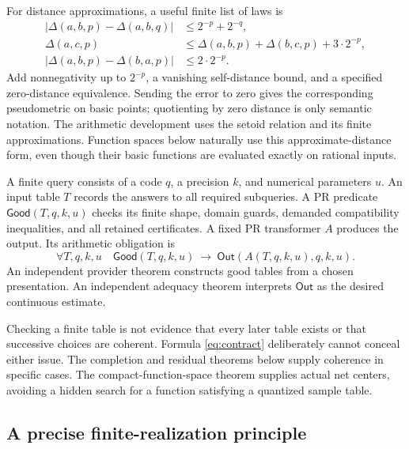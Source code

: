 For distance approximations, a useful finite list of laws is
\begin{align*}
 |\Delta(a,b,p)-\Delta(a,b,q)|&\leq 2^{-p}+2^{-q},\\
 \Delta(a,c,p)&\leq\Delta(a,b,p)+\Delta(b,c,p)+3\cdot2^{-p},\\
 |\Delta(a,b,p)-\Delta(b,a,p)|&\leq2\cdot2^{-p}.
\end{align*}
Add nonnegativity up to \(2^{-p}\), a vanishing self-distance bound, and a specified zero-distance equivalence. Sending the error to zero gives the corresponding pseudometric on basic points; quotienting by zero distance is only semantic notation. The arithmetic development uses the setoid relation and its finite approximations. Function spaces below naturally use this approximate-distance form, even though their basic functions are evaluated exactly on rational inputs.

\begin{definition}\label{def:observation}
A finite query consists of a code \(q\), a precision \(k\), and numerical parameters \(u\). An input table \(T\) records the answers to all required subqueries. A PR predicate \(\mathsf{Good}(T,q,k,u)\) checks its finite shape, domain guards, demanded compatibility inequalities, and all retained certificates. A fixed PR transformer \(A\) produces the output. Its arithmetic obligation is
\begin{equation}
 \forall T,q,k,u\quad
 \mathsf{Good}(T,q,k,u)\ \longrightarrow\
 \mathsf{Out}(A(T,q,k,u),q,k,u).
 \label{eq:contract}
\end{equation}
An independent provider theorem constructs good tables from a chosen presentation. An independent adequacy theorem interprets \(\mathsf{Out}\) as the desired continuous estimate.
\end{definition}

Checking a finite table is not evidence that every later table exists or that successive choices are coherent. Formula \eqref{eq:contract} deliberately cannot conceal either issue. The completion and residual theorems below supply coherence in specific cases. The compact-function-space theorem supplies actual net centers, avoiding a hidden search for a function satisfying a quantized sample table.

\subsection{A precise finite-realization principle}

